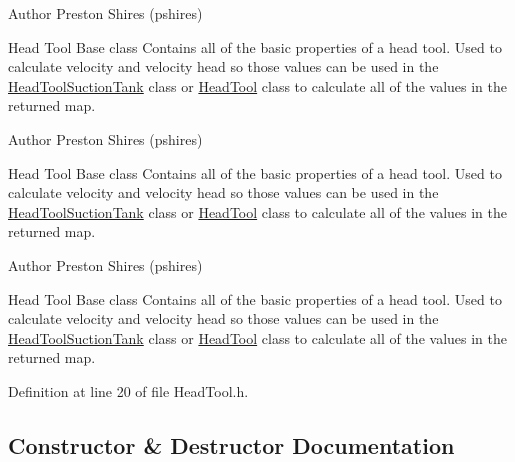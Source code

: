 \begin{DoxyAuthor}{Author}
Preston Shires (pshires) 
\end{DoxyAuthor}
Head Tool Base class Contains all of the basic properties of a head tool. Used to calculate velocity and velocity head so those values can be used in the \hyperlink{class_head_tool_suction_tank}{Head\+Tool\+Suction\+Tank} class or \hyperlink{class_head_tool}{Head\+Tool} class to calculate all of the values in the returned map.

\begin{DoxyAuthor}{Author}
Preston Shires (pshires) 
\end{DoxyAuthor}
Head Tool Base class Contains all of the basic properties of a head tool. Used to calculate velocity and velocity head so those values can be used in the \hyperlink{class_head_tool_suction_tank}{Head\+Tool\+Suction\+Tank} class or \hyperlink{class_head_tool}{Head\+Tool} class to calculate all of the values in the returned map.

\begin{DoxyAuthor}{Author}
Preston Shires (pshires) 
\end{DoxyAuthor}
Head Tool Base class Contains all of the basic properties of a head tool. Used to calculate velocity and velocity head so those values can be used in the \hyperlink{class_head_tool_suction_tank}{Head\+Tool\+Suction\+Tank} class or \hyperlink{class_head_tool}{Head\+Tool} class to calculate all of the values in the returned map. 

Definition at line 20 of file Head\+Tool.\+h.



\subsection{Constructor \& Destructor Documentation}
\mbox{\label{class_head_tool_base_ae5bb2325e1266c64b16937d964aea14f}} 
